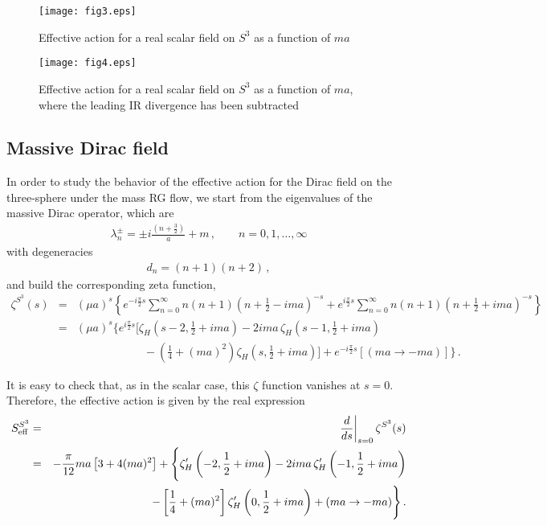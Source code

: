 \documentclass[12pt,a4paper]{article}
\newcommand{\beq}{\begin{eqnarray}}
\newcommand{\eeq}{\end{eqnarray}}
\newcommand{\nn}{\nonumber}
\numberwithin{equation}{section}
\begin{document}
\begin{figure}[h]
	\centering
	\begin{minipage}{.4\textwidth}
		\centering
		\texttt{[image: fig3.eps]}
		\caption{\small Effective action for a real scalar field on $S^3$ as a function of $ma$}
		\label{figure0}
	\end{minipage}
	\hspace{0.02\textwidth}
	\begin{minipage}{.4\textwidth}
		\centering
		\texttt{[image: fig4.eps]}
		\caption{\small Effective action for a real scalar field on $S^3$ as a function of $ma$, where the leading IR divergence has been subtracted}
		\label{figjj}
	\end{minipage}
\end{figure}

\subsection{Massive Dirac field}

In order to study the behavior of the effective action for the Dirac field on the three-sphere under the mass RG flow, we start from the eigenvalues of the massive Dirac operator, which are
\beq
\lambda_n^{\pm}= \pm i\frac{(n+\frac{3}{2})}{a} + m\,, \qquad n= 0,1,\ldots , \infty
\eeq
with degeneracies
\beq
d_n= (n+1)(n+2)\,,
\eeq
and build the corresponding zeta function,
\beq
\zeta^{S^3}(s) &=& (\mu a)^{s} \left\{e^{-i\frac{\pi}{2}s} \sum_{n=0}^{\infty} n(n+1) \left(n+\frac12 - i ma\right)^{-s} + e^{i\frac{\pi}{2}s} \sum_{n=0}^{\infty} n(n+1) \left(n+\frac12 + i ma\right)^{-s}\right\} \nn \\
&=&(\mu a)^{s}  \Bigg\{e^{i\frac{\pi}{2}s}\Bigg[\zeta_H\left(s-2, \frac12 + i ma\right) - 2 i ma\, \zeta_H\left(s-1, \frac12 + i ma\right)
    \nn\\
&&\qquad\qquad\qquad- \left(\frac14 + (ma)^2\right)\zeta_H\left(s, \frac12 + i ma\right)\Bigg]
  + e^{-i\frac{\pi}{2}s}\left[(ma\rightarrow -ma)\right]\Bigg\}\,.\label{zeta-Dirac}
\eeq

It is easy to check that, as in the scalar case, this $\zeta$ function vanishes at $s=0$. Therefore, the effective action is given by the real expression
\beq
S_{\mathrm{eff}}^{S^3} &=& \left.\frac{d}{ds} \right\vert_{s=0} \zeta^{S^3}(s) \nn \\
&=&- \frac{\pi}{12} ma \left[3 + 4 (ma)^2\right] + \Bigg{\{}\zeta^{\prime}_H\left(-2, \frac12 + i ma\right)- 2 i ma\,\zeta^{\prime}_H\left(-1, \frac12 + i ma\right)\nn\\
&&- \left[\frac14 + (ma)^2\right]\zeta^{\prime}_H\left(0, \frac12 + i ma\right) +(ma\rightarrow -ma)\Bigg{\}}\,.
\label{seffdirac}
\eeq
\end{document}
